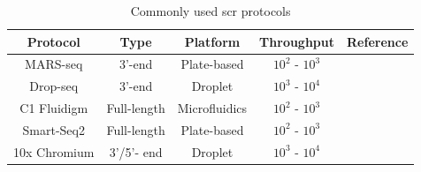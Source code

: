 \begin{table}[H]
\renewcommand{\arraystretch}{1.2} %
\centering
  \caption[Commonly used \gls{scr} protocols]{Commonly used \gls{scr} protocols}
  \label{tab:chp1_scprotocols}
  \begin{tabularx}{\textwidth}{C C C C C}
    \hline
    \textbf{Protocol} & \textbf{Type} & \textbf{Platform} & \textbf{Throughput} & \textbf{Reference} \\
    \hline
    MARS-seq & 3'-end & Plate-based & $10^2$ - $10^3$ & \textbf{\cite{jaitin_massively_2014}} \\
    \hline
    Drop-seq & 3'-end & Droplet & $10^3$ - $10^4$ & \textbf{\cite{macosko_highly_2015}} \\
    \hline
    C1 Fluidigm & Full-length & Microfluidics & $10^2$ - $10^3$ & \textbf{\cite{pollen_low-coverage_2014}} \\
    \hline
    Smart-Seq2 & Full-length & Plate-based & $10^2$ - $10^3$ & \textbf{\cite{picelli_smart-seq2_2013}} \\
    \hline
    10x Chromium & 3'/5'- end & Droplet & $10^3$ - $10^4$ & \textbf{\cite{zheng_massively_2017}} \\
    \hline
    
    
  \end{tabularx}

\end{table}


